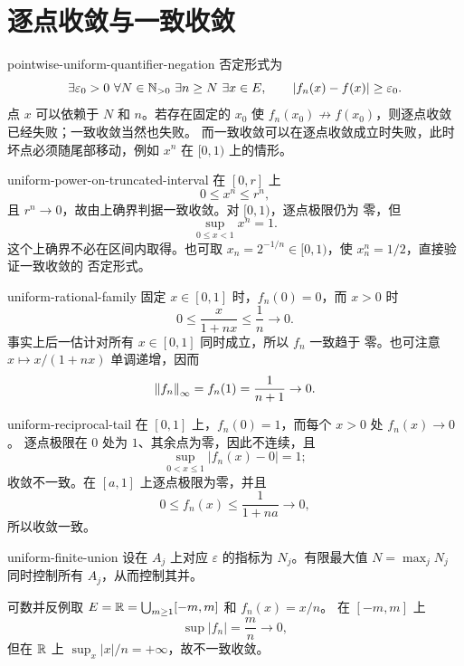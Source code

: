 \chapter{逐点收敛与一致收敛}
\label{chap:pointwise-uniform-convergence-solutions}

\begin{solution}{pointwise-uniform-quantifier-negation}
否定形式为
\[
 \exists\varepsilon_0>0\ \forall N\in\Npos\ \exists n\ge N\
 \exists x\in E,\qquad |f_n(x)-f(x)|\ge\varepsilon_0.
\]
点 \(x\) 可以依赖于 \(N\) 和 \(n\)。若存在固定的 \(x_0\) 使
\(f_n(x_0)\not\to f(x_0)\)，则逐点收敛已经失败；一致收敛当然也失败。
而一致收敛可以在逐点收敛成立时失败，此时坏点必须随尾部移动，例如
\(x^n\) 在 \([0,1)\) 上的情形。
\end{solution}

\begin{solution}{uniform-power-on-truncated-interval}
在 \([0,r]\) 上
\[
 0\le x^n\le r^n,
\]
且 \(r^n\to0\)，故由上确界判据一致收敛。对 \([0,1)\)，逐点极限仍为
零，但
\[
 \sup_{0\le x<1}x^n=1.
\]
这个上确界不必在区间内取得。也可取
\(x_n=2^{-1/n}\in[0,1)\)，使 \(x_n^n=1/2\)，直接验证一致收敛的
否定形式。
\end{solution}

\begin{solution}{uniform-rational-family}
固定 \(x\in[0,1]\) 时，\(f_n(0)=0\)，而 \(x>0\) 时
\[
 0\le\frac{x}{1+nx}\le\frac1n\to0.
\]
事实上后一估计对所有 \(x\in[0,1]\) 同时成立，所以 \(f_n\) 一致趋于
零。也可注意 \(x\mapsto x/(1+nx)\) 单调递增，因而
\[
 \left\lVert f_n\right\rVert_\infty=f_n(1)=\frac1{n+1}\to0.
\]
\end{solution}

\begin{solution}{uniform-reciprocal-tail}
在 \([0,1]\) 上，\(f_n(0)=1\)，而每个 \(x>0\) 处 \(f_n(x)\to0\)。
逐点极限在 \(0\) 处为 \(1\)、其余点为零，因此不连续，且
\[
 \sup_{0<x\le1}|f_n(x)-0|=1;
\]
收敛不一致。在 \([a,1]\) 上逐点极限为零，并且
\[
 0\le f_n(x)\le\frac1{1+na}\to0,
\]
所以收敛一致。
\end{solution}

\begin{solution}{uniform-finite-union}
设在 \(A_j\) 上对应 \(\varepsilon\) 的指标为 \(N_j\)。有限最大值
\(N=\max_jN_j\) 同时控制所有 \(A_j\)，从而控制其并。

可数并反例取 \(E=\mathbb{R}=\bigcup_{m\ge1}[-m,m]\) 和 \(f_n(x)=x/n\)。
在 \([-m,m]\) 上
\[
 \sup|f_n|=\frac mn\to0,
\]
但在 \(\mathbb{R}\) 上 \(\sup_x|x|/n=+\infty\)，故不一致收敛。
\end{solution}

